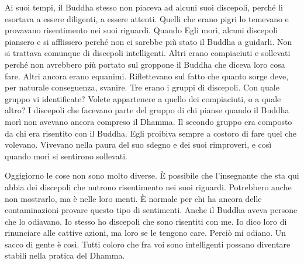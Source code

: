 Ai suoi tempi, il Buddha stesso non piaceva ad alcuni suoi discepoli,
perché li esortava a essere diligenti, a essere attenti. Quelli che
erano pigri lo temevano e provavano risentimento nei suoi riguardi.
Quando Egli morì, alcuni discepoli piansero e si afflissero perché non
ci sarebbe più stato il Buddha a guidarli. Non si trattava comunque di
discepoli intelligenti. Altri erano compiaciuti e sollevati perché non
avrebbero più portato sul groppone il Buddha che diceva loro cosa fare.
Altri ancora erano equanimi. Riflettevano sul fatto che quanto sorge
deve, per naturale conseguenza, svanire. Tre erano i gruppi di
discepoli. Con quale gruppo vi identificate? Volete appartenere a quello
dei compiaciuti, o a quale altro? I discepoli che facevano parte del
gruppo di chi pianse quando il Buddha morì non avevano ancora compreso
il Dhamma. Il secondo gruppo era composto da chi era risentito con il
Buddha. Egli proibiva sempre a costoro di fare quel che volevano.
Vivevano nella paura del suo sdegno e dei suoi rimproveri, e così quando
morì si sentirono sollevati.

Oggigiorno le cose non sono molto diverse. È possibile che l'insegnante
che sta qui abbia dei discepoli che nutrono risentimento nei suoi
riguardi. Potrebbero anche non mostrarlo, ma è nelle loro menti. È
normale per chi ha ancora delle contaminazioni provare questo tipo di
sentimenti. Anche il Buddha aveva persone che lo odiavano. Io stesso ho
discepoli che sono risentiti con me. Io dico loro di rinunciare alle
cattive azioni, ma loro se le tengono care. Perciò mi odiano. Un sacco
di gente è così. Tutti coloro che fra voi sono intelligenti possano
diventare stabili nella pratica del Dhamma.

